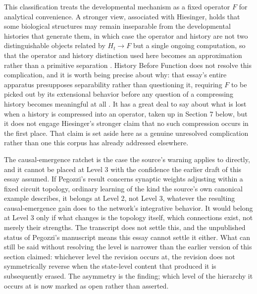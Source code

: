 \documentclass[11pt]{article}
\begin{document}
This classification treats the developmental mechanism as a fixed operator $F$ for analytical convenience. A stronger view, associated with Hiesinger, holds that some biological structures may remain inseparable from the developmental histories that generate them, in which case the operator and history are not two distinguishable objects related by $H_t \to F$ but a single ongoing computation, so that the operator and history distinction used here becomes an approximation rather than a primitive separation \cite{hiesinger2021}. History Before Function does not resolve this complication, and it is worth being precise about why: that essay's entire apparatus presupposes separability rather than questioning it, requiring $F$ to be picked out by its extensional behavior before any question of a compressing history becomes meaningful at all \cite{historybeforefunction}. It has a great deal to say about what is lost when a history is compressed into an operator, taken up in Section 7 below, but it does not engage Hiesinger's stronger claim that no such compression occurs in the first place. That claim is set aside here as a genuine unresolved complication rather than one this corpus has already addressed elsewhere.

The causal-emergence ratchet is the case the source's warning applies to directly, and it cannot be placed at Level 3 with the confidence the earlier draft of this essay assumed. If Pegozzi's result concerns synaptic weights adjusting within a fixed circuit topology, ordinary learning of the kind the source's own canonical example describes, it belongs at Level 2, not Level 3, whatever the resulting causal-emergence gain does to the network's integrative behavior. It would belong at Level 3 only if what changes is the topology itself, which connections exist, not merely their strengths. The transcript does not settle this, and the unpublished status of Pegozzi's manuscript means this essay cannot settle it either. What can still be said without resolving the level is narrower than the earlier version of this section claimed: whichever level the revision occurs at, the revision does not symmetrically reverse when the state-level content that produced it is subsequently erased. The asymmetry is the finding; which level of the hierarchy it occurs at is now marked as open rather than asserted.
\end{document}
